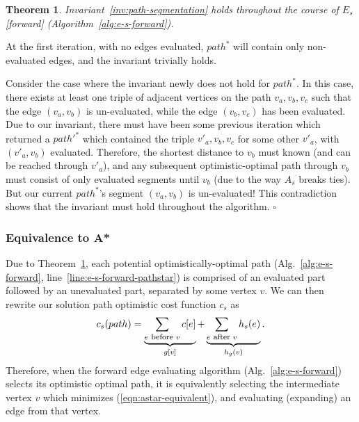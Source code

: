 \documentclass{article}
\newtheorem{theorem}{Theorem}
\newenvironment{proof}[1][Proof]{\begin{trivlist}
   \item[\hskip \labelsep {\bfseries #1}]}{\hfill$\square$\end{trivlist}}
\begin{document}
\begin{theorem}
Invariant~\ref{inv:path-segmentation} holds throughout the course of
$E_s$ [forward] (Algorithm~\ref{alg:e-s-forward}).
\label{thm:seg-fwd}
\end{theorem}

\begin{proof}
At the first iteration, with no edges evaluated,
$path^*$ will contain only non-evaluated edges,
and the invariant trivially holds.

Consider the case where the invariant newly does not hold for $path^*$.
In this case, there exists at least one triple of adjacent vertices
on the path $v_a, v_b, v_c$
such that the edge $(v_a, v_b)$ is un-evaluated,
while the edge $(v_b, v_c)$ has been evaluated.
Due to our invariant,
there must have been some previous iteration which returned a
$path'^*$ which contained the triple
$v'_a, v_b, v_c$ for some other $v'_a$,
with $(v'_a, v_b)$ evaluated.
Therefore, the shortest distance to $v_b$ must known (and can be
reached through $v'_a$),
and any subsequent optimistic-optimal path through $v_b$
must consist of only evaluated segments until $v_b$
(due to the way $A_s$ breaks ties).
But our current $path^*$'s segment $(v_a, v_b)$ is un-evaluated!
This contradiction shows that the invariant must hold throughout the
algorithm.
\end{proof}

\subsubsection{Equivalence to A*}

Due to Theorem~\ref{thm:seg-fwd},
each potential optimistically-optimal path
(Alg.~\ref{alg:e-s-forward}, line~\ref{line:e-s-forward-pathstar})
is comprised of an evaluated part followed by an unevaluated part,
separated by some vertex $v$.
We can then rewrite our solution path optimistic cost function $c_s$ as
\begin{equation}
   c_s(path)
      = \underbrace{\sum_{e \mbox{ \footnotesize before } v} c[e]}_{g[v]}
      + \underbrace{\sum_{e \mbox{ \footnotesize after } v} h_s(e)}_{h_g(v)}
   .
\label{eqn:astar-equivalent}
\end{equation}
Therefore, when the forward edge evaluating algorithm
(Alg.~\ref{alg:e-s-forward}) selects its optimistic optimal path,
it is equivalently selecting the intermediate vertex $v$ which
minimizes (\ref{eqn:astar-equivalent}),
and evaluating (expanding) an edge from that vertex.
\end{document}
